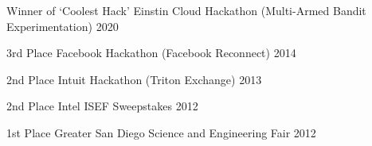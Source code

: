 

\begin{cvhonors}
  \cvhonor
    {Winner of `Coolest Hack'} %
    {Einstin Cloud Hackathon (Multi-Armed Bandit Experimentation)} %
    {} %
    {2020} %

  \cvhonor
    {3rd Place} %
    {Facebook Hackathon (Facebook Reconnect)} %
    {} %
    {2014} %

  \cvhonor
    {2nd Place} %
    {Intuit Hackathon (Triton Exchange)} %
    {} %
    {2013} %

  \cvhonor
    {2nd Place} %
    {Intel ISEF Sweepstakes} %
    {} %
    {2012} %

  \cvhonor
    {1st Place} %
    {Greater San Diego Science and Engineering Fair} %
    {} %
    {2012} %

\end{cvhonors}
